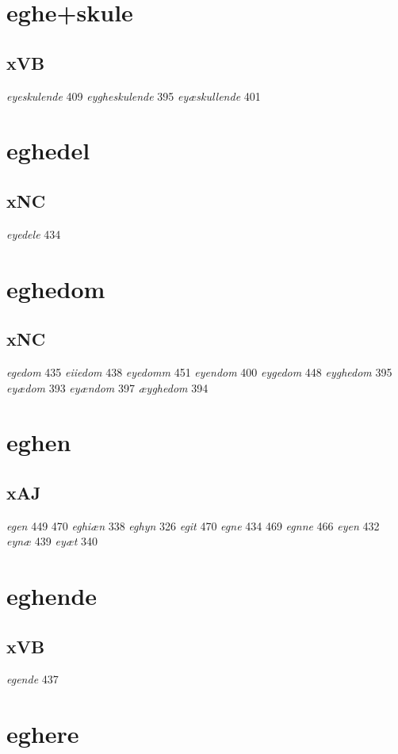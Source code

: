 \documentclass[a4paper,twocolumn]{article}
\begin{document}
\section{eghe+skule}
\label{sec:org785bf60}
\subsection{xVB}
\label{sec:org79d29fa}
\emph{eyeskulende} 409 \emph{eygheskulende} 395 \emph{eyæskullende} 401 
\section{eghedel}
\label{sec:org6b73dc7}
\subsection{xNC}
\label{sec:org9094f64}
\emph{eyedele} 434 
\section{eghedom}
\label{sec:orgba0a969}
\subsection{xNC}
\label{sec:orgbccca7f}
\emph{egedom} 435 \emph{eiiedom} 438 \emph{eyedomm} 451 \emph{eyendom} 400 \emph{eygedom} 448 \emph{eyghedom} 395 \emph{eyædom} 393 \emph{eyændom} 397 \emph{æyghedom} 394 
\section{eghen}
\label{sec:orgc871d86}
\subsection{xAJ}
\label{sec:org9be8858}
\emph{egen} 449 470 \emph{eghiæn} 338 \emph{eghyn} 326 \emph{egit} 470 \emph{egne} 434 469 \emph{egnne} 466 \emph{eyen} 432 \emph{eynæ} 439 \emph{eyæt} 340 
\section{eghende}
\label{sec:org57cf460}
\subsection{xVB}
\label{sec:org5b54287}
\emph{egende} 437 
\section{eghere}
\label{sec:org01963a1}
\end{document}
